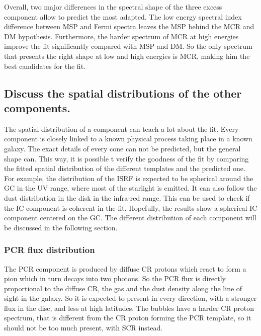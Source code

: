 Overall, two major differences in the spectral shape of the three excess component allow to predict the most adapted. The low energy spectral index difference between MSP and Fermi spectra leaves the MSP behind the MCR and DM hypothesis. Furthermore, the harder spectrum of MCR at high energies improve the fit significantly compared with MSP and DM. So the only spectrum that presents the right shape at low and high energies is MCR, making him the best candidates for the fit.


\subsection{Discuss the spatial distributions of the other components.}

The spatial distribution of a component can teach a lot about the fit. Every component is closely linked to a known physical process taking place in a known galaxy. The exact details of every cone can not be predicted, but the general shape can. This way, it is possible t verify the goodness of the fit by comparing the fitted spatial distribution of the different templates and the predicted one.
For example, the distribution of the ISRF is expected to be spherical around the GC in the UV range, where most of the starlight is emitted. It can also follow the dust distribution in the disk in the infra-red range. This can be used to check if the IC component is coherent in the fit. Hopefully, the results show a spherical IC component centered on the GC.
The different distribution of each component will be discussed in the following section.

\subsubsection{PCR flux distribution}
The PCR component is produced by diffuse CR protons which react to form a pion which in turn decays into two photons. So the PCR flux is directly proportional to the diffuse CR, the gas and the dust density along the line of sight in the galaxy. So it is expected to present in every direction, with a stronger flux in the disc, and less at high latitudes. The bubbles have a harder CR proton spectrum, that is different from the CR proton forming the PCR template, so it should not be too much present, with SCR instead.

